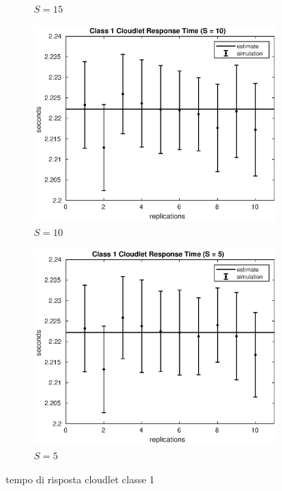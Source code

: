 \begin{figure}[!h]
\begin{subfigure}[t]{0.49\textwidth}
\caption{$S = 15$}
\label{15_s1clet}
\end{subfigure}
%
\begin{subfigure}[t]{0.49\textwidth}
\includegraphics[width=\textwidth]{figures/simul/10_500K_s1clet}
\caption{$S = 10$}
\label{10_s1clet}
\end{subfigure}
%
\begin{subfigure}[t]{0.49\textwidth}
\includegraphics[width=\textwidth]{figures/simul/5_500K_s1clet}
\caption{$S = 5$}
\label{5_s1clet}
\end{subfigure}
%
\caption{tempo di risposta cloudlet classe 1}
\label{plot:s1clet}
\end{figure}
%
%

